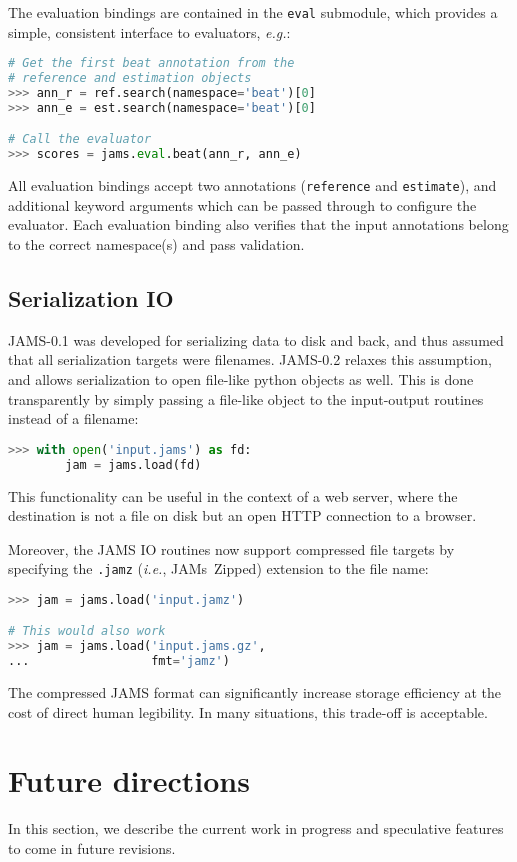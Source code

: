 \documentclass{article}
\begin{document}
The evaluation bindings are contained in the \texttt{eval} submodule, which provides
a simple, consistent interface to evaluators, \emph{e.g.}:
\begin{lstlisting}[language=python]
# Get the first beat annotation from the
# reference and estimation objects
>>> ann_r = ref.search(namespace='beat')[0]
>>> ann_e = est.search(namespace='beat')[0]

# Call the evaluator
>>> scores = jams.eval.beat(ann_r, ann_e)
\end{lstlisting}
All evaluation bindings accept two annotations (\texttt{ref\-erence} and \texttt{estimate}), 
and additional keyword arguments which can be passed through to configure the evaluator.
Each evaluation binding also verifies that the input annotations belong to the 
correct namespace(s) and pass validation.


\subsection{Serialization IO}\label{sec:imp:compression}

JAMS-0.1 was developed for serializing data to disk and back, and thus assumed that all
serialization targets were filenames.  JAMS-0.2 relaxes this assumption, and allows
serialization to open file-like python objects as well.  This is done transparently by
simply passing a file-like object to the input-output routines instead of a filename:
\begin{lstlisting}[language=python]
>>> with open('input.jams') as fd:
        jam = jams.load(fd)
\end{lstlisting}
This functionality can be useful in the context of a web server, where 
the destination is not a file on disk but an open HTTP connection to a browser.

Moreover, the JAMS IO routines now support compressed file targets by specifying the
\texttt{.jamz} (\emph{i.e.}, JAMs~Zipped) extension to the file name:
\begin{lstlisting}[language=python]
>>> jam = jams.load('input.jamz')

# This would also work
>>> jam = jams.load('input.jams.gz',
...                 fmt='jamz')
\end{lstlisting}
The compressed JAMS format can significantly increase storage efficiency at the cost of
direct human legibility.  In many situations, this trade-off is acceptable.

\section{Future directions}\label{sec:future}
In this section, we describe the current work in progress and speculative features to
come in future revisions.
\end{document}
